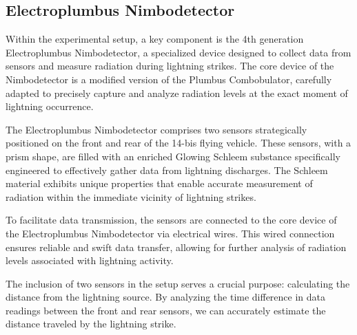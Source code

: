 \documentclass[portuguese]{cenarticle}
\begin{document}
\subsection{Electroplumbus Nimbodetector}

Within the experimental setup, a key component is the 4th generation Electroplumbus Nimbodetector, a specialized device designed to collect data from sensors and measure radiation during lightning strikes. The core device of the Nimbodetector is a modified version of the Plumbus Combobulator, carefully adapted to precisely capture and analyze radiation levels at the exact moment of lightning occurrence.

The Electroplumbus Nimbodetector comprises two sensors strategically positioned on the front and rear of the 14-bis flying vehicle. These sensors, with a prism shape, are filled with an enriched Glowing Schleem substance specifically engineered to effectively gather data from lightning discharges. The Schleem material exhibits unique properties that enable accurate measurement of radiation within the immediate vicinity of lightning strikes.

To facilitate data transmission, the sensors are connected to the core device of the Electroplumbus Nimbodetector via electrical wires. This wired connection ensures reliable and swift data transfer, allowing for further analysis of radiation levels associated with lightning activity.

The inclusion of two sensors in the setup serves a crucial purpose: calculating the distance from the lightning source. By analyzing the time difference in data readings between the front and rear sensors, we can accurately estimate the distance traveled by the lightning strike.
\end{document}
